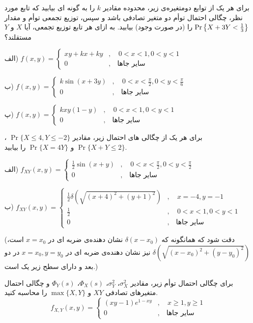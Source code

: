 \Q
برای هر یک از توابع دومتغیره‌ی زیر، محدوده مقادیر $k$ را به گونه ای بیابید که تابع مورد نظر، چگالی احتمال توأم دو متغیر تصادفی باشد و سپس، توزیع تجمعی توأم و مقدار $\Pr\left\{X+3Y<{1\over 3}\right\}$ را (در صورت وجود) بیابید. به ازای هر تابع توزیع تجمعی، آیا $X$ و $Y$ مستقلند؟

الف)
$
f(x,y)=
\begin{cases}
xy+kx+ky&,\quad 0<x<1,0<y<1\\
0&,\quad \text{سایر جاها}
\end{cases}
$

ب)
$
f(x,y)=
\begin{cases}
k\sin(x+3y)&,\quad 0<x<\frac{\pi}{2},0<y<\frac{\pi}{6}\\
0&,\quad \text{سایر جاها}
\end{cases}
$

پ)
$
f(x,y)=\begin{cases}
kxy(1-y)&,\quad 0<x<1,0<y<1\\
0&,\quad \text{سایر جاها}
\end{cases}
$

%

\Q
برای هر یک از چگالی های احتمال زیر، مقادیر
$\Pr\{X\le 4,Y\le -2\}$
،
$\Pr\{X+Y\le 2\}$
و
$\Pr\{X=4Y\}$
را بیابید.

الف)
$
f_{XY}(x,y)=
\begin{cases}
\frac{1}{2}\sin (x+y)&,\quad 0<x<\frac{\pi}{2},0<y<\frac{\pi}{2}\\
0&,\quad \text{سایر جاها}
\end{cases}
$

ب)
$
f_{XY}(x,y)=
\begin{cases}
\frac{1}{2}\delta\left(\sqrt{(x+4)^2+(y+1)^2}\right)&,\quad x=-4,y=-1\\
\frac{1}{2}&,\quad 0<x<1,0<y<1\\
0&,\quad \text{سایر جاها}
\end{cases}
$

(دقت شود که همانگونه که 
$
\delta(x-x_0)
$
نشان دهنده‌ی ضربه ای در 
$
x=x_0
$
است، 
$
\delta(\sqrt{(x-x_0)^2+(y-y_0)^2})
$
نیز نشان دهنده‌ی ضربه ای در 
$
x=x_0,y=y_0
$
در دو بعد و دارای سطح زیر یک است.)

\Q
برای چگالی احتمال توأم زیر، مقادیر
$
\sigma_X^2
$،
$
\sigma_Y^2
$،
$
\Phi_X(s)
$،
$
\Phi_Y(s)
$
و چگالی احتمال متغیرهای تصادفی $XY$ و 
$
\max\{X,Y\}
$
 را محاسبه کنید.
$$
f_{X,Y}(x,y)=\begin{cases}
(xy-1)e^{1-xy}&,\quad x\ge 1,y\ge 1\\
0&,\quad \text{سایر جاها}
\end{cases}
$$

